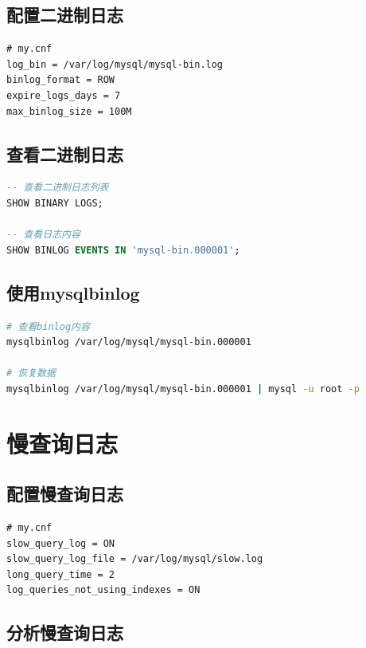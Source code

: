 \documentclass[12pt,UTF8]{ctexbook}
\begin{document}
\subsection*{配置二进制日志}

\begin{lstlisting}
# my.cnf
log_bin = /var/log/mysql/mysql-bin.log
binlog_format = ROW
expire_logs_days = 7
max_binlog_size = 100M
\end{lstlisting}

\subsection*{查看二进制日志}

\begin{lstlisting}[language=sql]
-- 查看二进制日志列表
SHOW BINARY LOGS;

-- 查看日志内容
SHOW BINLOG EVENTS IN 'mysql-bin.000001';
\end{lstlisting}

\subsection*{使用mysqlbinlog}

\begin{lstlisting}[language=bash]
# 查看binlog内容
mysqlbinlog /var/log/mysql/mysql-bin.000001

# 恢复数据
mysqlbinlog /var/log/mysql/mysql-bin.000001 | mysql -u root -p
\end{lstlisting}

\section{慢查询日志}
\label{sec:slow-query-log}

\subsection*{配置慢查询日志}

\begin{lstlisting}
# my.cnf
slow_query_log = ON
slow_query_log_file = /var/log/mysql/slow.log
long_query_time = 2
log_queries_not_using_indexes = ON
\end{lstlisting}

\subsection*{分析慢查询日志}
\end{document}
